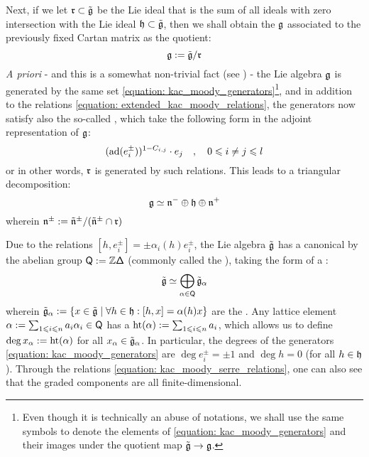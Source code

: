         Next, if we let $\mathfrak{r} \subset \tilde{\mathfrak{g}}$ be the Lie ideal that is the sum of all ideals with zero intersection with the Lie ideal $\mathfrak{h} \subset \tilde{\mathfrak{g}}$, then we shall obtain the  $\mathfrak{g}$ associated to the previously fixed Cartan matrix as the quotient:
            $$\mathfrak{g} := \tilde{\mathfrak{g}}/\mathfrak{r}$$
        \textit{A priori} - and this is a somewhat non-trivial fact (see \cite[Theorem 9.11]{kac_infinite_dimensional_lie_algebras}) - the Lie algebra $\mathfrak{g}$ is generated by the same set \eqref{equation: kac_moody_generators}\footnote{Even though it is technically an abuse of notations, we shall use the same symbols to denote the elements of \eqref{equation: kac_moody_generators} and their images under the quotient map $\tilde{\mathfrak{g}} \to \mathfrak{g}$.}, and in addition to the relations \eqref{equation: extended_kac_moody_relations}, the generators now satisfy also the so-called , which take the following form in the adjoint representation of $\mathfrak{g}$:
            \begin{equation} \label{equation: kac_moody_serre_relations}
                ( \mathrm{ad}( e_i^{\pm} ) )^{1 - C_{i, j}} \cdot e_j \quad, \quad 0 \leqslant i \not = j \leqslant l
            \end{equation}
        or in other words, $\mathfrak{r}$ is generated by such relations. This leads to a triangular decomposition:
            $$\mathfrak{g} \simeq \mathfrak{n}^- \oplus \mathfrak{h} \oplus \mathfrak{n}^+$$
        wherein $\mathfrak{n}^{\pm} := \tilde{\mathfrak{n}}^{\pm}/( \tilde{\mathfrak{n}}^{\pm} \cap \mathfrak{r} )$

        Due to the relations $[h, e_i^{\pm}] = \pm \alpha_i(h) e_i^{\pm}$, the Lie algebra $\tilde{\mathfrak{g}}$ has a canonical  by the abelian group $\mathsf{Q} := \mathbb{Z} \mathsf{\Delta}$ (commonly called the ), taking the form of a :
            $$\tilde{\mathfrak{g}} \simeq \bigoplus_{\alpha \in \mathsf{Q}} \tilde{\mathfrak{g}}_{\alpha}$$
        wherein $\tilde{\mathfrak{g}}_{\alpha} := \{ x \in \tilde{\mathfrak{g}} \mid \forall h \in \mathfrak{h}: [h, x] = \alpha(h) x \}$ are the . Any lattice element $\alpha := \sum_{1 \leqslant i \leqslant n} a_i \alpha_i \in \mathsf{Q}$ has a  $\operatorname{ht}(\alpha) := \sum_{1 \leqslant i \leqslant n} a_i$, which allows us to define $\deg x_{\alpha} := \operatorname{ht}(\alpha)$ for all $x_{\alpha} \in \tilde{\mathfrak{g}}_{\alpha}$. In particular, the degrees of the generators \eqref{equation: kac_moody_generators} are $\deg e_i^{\pm} = \pm 1$ and $\deg h = 0$ (for all $h \in \mathfrak{h}$). Through the relations \eqref{equation: kac_moody_serre_relations}, one can also see that the graded components are all finite-dimensional.

